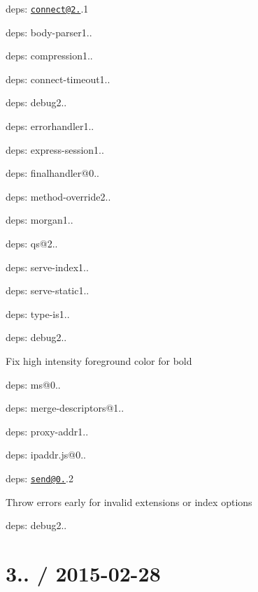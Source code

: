 \begin{DoxyItemize}
\item deps\+: \href{mailto:connect@2.29}{\tt connect@2.}.1
\begin{DoxyItemize}
\item deps\+: body-\/parser1..
\item deps\+: compression1..
\item deps\+: connect-\/timeout1..
\item deps\+: debug2..
\item deps\+: errorhandler1..
\item deps\+: express-\/session1..
\item deps\+: finalhandler@0..
\item deps\+: method-\/override2..
\item deps\+: morgan1..
\item deps\+: qs@2..
\item deps\+: serve-\/index1..
\item deps\+: serve-\/static1..
\item deps\+: type-\/is1..
\end{DoxyItemize}
\item deps\+: debug2..
\begin{DoxyItemize}
\item Fix high intensity foreground color for bold
\item deps\+: ms@0..
\end{DoxyItemize}
\item deps\+: merge-\/descriptors@1..
\item deps\+: proxy-\/addr1..
\begin{DoxyItemize}
\item deps\+: ipaddr.\+js@0..
\end{DoxyItemize}
\item deps\+: \href{mailto:send@0.12}{\tt send@0.}.2
\begin{DoxyItemize}
\item Throw errors early for invalid {\ttfamily extensions} or {\ttfamily index} options
\item deps\+: debug2..
\end{DoxyItemize}
\end{DoxyItemize}

\section*{3.. / 2015-\/02-\/28 }


